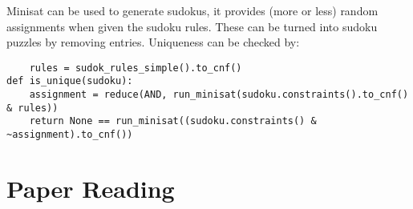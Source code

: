 \documentclass[]{eptcs}
\begin{document}
		Minisat can be used to generate sudokus, it provides (more or less) random assignments when given the sudoku rules.
		These can be turned into sudoku puzzles by removing entries.
		Uniqueness can be checked by:
		
\begin{lstlisting}
	rules = sudok_rules_simple().to_cnf()
def is_unique(sudoku):
	assignment = reduce(AND, run_minisat(sudoku.constraints().to_cnf() & rules))
	return None == run_minisat((sudoku.constraints() & ~assignment).to_cnf())
\end{lstlisting}
	
	\newpage
	\section*{Paper Reading}
		
\end{document}

